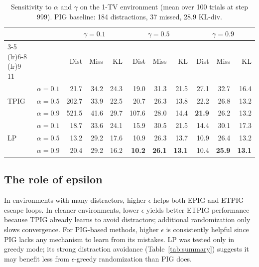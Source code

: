 \documentclass[letterpaper]{article}
\begin{document}
\begin{table}
\caption{Sensitivity to $\alpha$ and $\gamma$ on the 1-TV environment
  (mean over 100 trials at step 999).  PIG baseline: 184 distractions,
  37 missed, 28.9 KL-div.}
\label{tab:ablation}
\vspace{0.5\baselineskip}
\centering
\small
\begin{tabular}{@{}ll rrr rrr rrr@{}}
\toprule
& & \multicolumn{3}{c}{$\gamma = 0.1$}
  & \multicolumn{3}{c}{$\gamma = 0.5$}
  & \multicolumn{3}{c}{$\gamma = 0.9$} \\
\cmidrule(lr){3-5} \cmidrule(lr){6-8} \cmidrule(lr){9-11}
& & Dist & Miss & KL & Dist & Miss & KL & Dist & Miss & KL \\
\midrule
\multirow{3}{*}{TPIG}
& $\alpha{=}0.1$ &  21.7 & 34.2 & 24.3 &  19.0 & 31.3 & 21.5 & 27.1 & 32.7 & 16.4 \\
& $\alpha{=}0.5$ & 202.7 & 33.9 & 22.5 &  20.7 & 26.3 & 13.8 & 22.2 & 26.8 & 13.2 \\
& $\alpha{=}0.9$ & 521.5 & 41.6 & 29.7 & 107.6 & 28.0 & 14.4 & \textbf{21.9} & 26.2 & 13.2 \\
\midrule
\multirow{3}{*}{LP}
& $\alpha{=}0.1$ &  18.7 & 33.6 & 24.1 &  15.9 & 30.5 & 21.5 & 14.4 & 30.1 & 17.3 \\
& $\alpha{=}0.5$ &  13.2 & 29.2 & 17.6 &  10.9 & 26.3 & 13.7 & 10.9 & 26.4 & 13.2 \\
& $\alpha{=}0.9$ &  20.4 & 29.2 & 16.2 & \textbf{10.2} & \textbf{26.1} & \textbf{13.1} & 10.4 & \textbf{25.9} & \textbf{13.1} \\
\bottomrule
\end{tabular}
\end{table}

\subsection{The role of epsilon}

In environments with many distractors, higher $\epsilon$ helps both
EPIG and ETPIG escape loops.  In cleaner environments, lower
$\epsilon$ yields better ETPIG performance because TPIG already
learns to avoid distractors; additional randomization only slows
convergence.  For PIG-based methods, higher $\epsilon$ is consistently
helpful since PIG lacks any mechanism to learn from its mistakes.
LP was tested only in greedy mode; its strong distraction avoidance
(Table~\ref{tab:summary}) suggests it may benefit less from
$\epsilon$-greedy randomization than PIG does.
\end{document}
